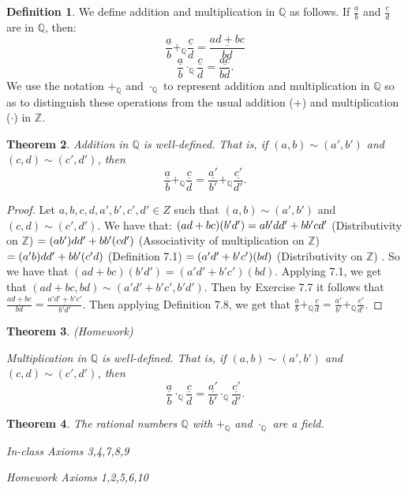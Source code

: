\documentclass[12pt]{article}
\newcommand{\bbQ}{\mathbb{Q}}
\newcommand{\bbZ}{\mathbb{Z}}
\newcommand{\fr}[2]{\frac{\underline{#1}}{#2}}
\renewcommand{\_}[1]{\underline{ #1 }}
\newtheorem{theorem}{Theorem}[section]
\theoremstyle{definition}
\newtheorem{definition}[theorem]{Definition}
\numberwithin{equation}{subsection}
\begin{document}
\begin{definition}
We define addition and multiplication in $\bbQ$ as follows.  If $\displaystyle \fr{a}{b}$ and $\displaystyle \fr{c}{d}$ are in $\bbQ$, then:
$$
\fr{a}{b}+_\bbQ \fr{c}{d}=\fr{ad+bc}{bd}
$$
$$
\fr{a}{b}\cdot_\bbQ \fr{c}{d}=\fr{ac}{ bd}.
$$
We use the notation $+_\bbQ$ and $\cdot_\bbQ$ to represent addition and multiplication in $\bbQ$
so as to distinguish these operations from the usual addition ($+$) and multiplication ($\cdot$) in $\bbZ$.
\end{definition}

\begin{theorem}
Addition in $\bbQ$ is well-defined.  That is, if $(a,b)\sim (a', b')$ and $(c,d)\sim (c',d')$, then
$$
\fr{a}{b}+_\bbQ \fr{c}{d}=\fr{a'}{b'}+_\bbQ \fr{c'}{d'}.
$$
\end{theorem}

\begin{proof}
Let $a,b,c,d,a',b',c',d' \in Z$ such that $(a,b) \sim (a',b')$ and $(c,d) \sim (c',d')$. We have that:
$(ad + bc)(b'd') = ab'dd' + bb'cd' \medskip$ (Distributivity on $\bbZ$) \newline
$= (ab')dd' + bb'(cd') \medskip$ (Associativity of multiplication on $\bbZ$) \newline
$= (a'b)dd' + bb'(c'd) \medskip$ (Definition 7.1) \newline
$= (a'd' + b'c')(bd) \medskip$ (Distributivity on $\bbZ$) \newline.
So we have that $(ad + bc)(b'd') = (a'd' + b'c')(bd)$. Applying 7.1, we get that $(ad + bc, bd) \sim (a'd' + b'c', b'd')$. Then by Exercise 7.7 it follows that $\fr{ad + bc}{bd} = \fr{a'd' + b'c'}{b'd'}$. Then applying Definition 7.8, we get that $\fr{a}{b} +_\bbQ \fr{c}{d} = \fr{a'}{b'} +_\bbQ \fr{c'}{d'}$.
\end{proof}

\begin{theorem} {(Homework)}

Multiplication in $\bbQ$ is well-defined.  That is, if $(a,b)\sim (a', b')$ and $(c,d)\sim (c',d')$, then
$$
\fr{a}{b}\cdot_\bbQ \fr{c}{d}=\fr{a'}{b'}\cdot_\bbQ \fr{c'}{d'}.
$$
\end{theorem}

\begin{theorem}
The rational numbers $\bbQ$ with  $+_\bbQ$ and $\cdot_\bbQ$ are a field. 

In-class Axioms 3,4,7,8,9

{Homework Axioms 1,2,5,6,10}
\end{theorem}
\end{document}
